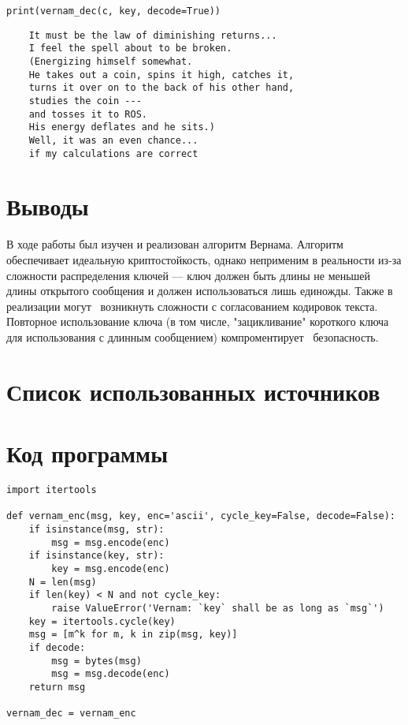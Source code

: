 \documentclass{article}
\begin{document}
\begin{verbatim}
print(vernam_dec(c, key, decode=True))
\end{verbatim}

\begin{verbatim}
    It must be the law of diminishing returns...
    I feel the spell about to be broken.
    (Energizing himself somewhat.
    He takes out a coin, spins it high, catches it,
    turns it over on to the back of his other hand,
    studies the coin ---
    and tosses it to ROS.
    His energy deflates and he sits.)
    Well, it was an even chance...
    if my calculations are correct
\end{verbatim}



\section{Выводы}
В ходе работы был изучен и реализован алгоритм Вернама.
Алгоритм обеспечивает идеальную криптостойкость,
однако неприменим в реальности из-за сложности
распределения ключей --- ключ должен быть
длины не меньшей длины открытого сообщения
и должен использоваться лишь единожды.
Также в реализации могут~\cite{vernam1926cipher}
возникнуть сложности
с согласованием кодировок текста.
Повторное использование ключа
(в том числе, "зацикливание" короткого ключа
для использования с длинным сообщением)
компроментирует~\cite{keyreuse@se} безопасность.

\section{Список использованных источников}
\printbibliography[heading=none]

\section{Код программы}
\begin{verbatim}
import itertools

def vernam_enc(msg, key, enc='ascii', cycle_key=False, decode=False):
    if isinstance(msg, str):
        msg = msg.encode(enc)
    if isinstance(key, str):
        key = msg.encode(enc)
    N = len(msg)
    if len(key) < N and not cycle_key:
        raise ValueError('Vernam: `key` shall be as long as `msg`')
    key = itertools.cycle(key)
    msg = [m^k for m, k in zip(msg, key)]
    if decode:
        msg = bytes(msg)
        msg = msg.decode(enc)
    return msg

vernam_dec = vernam_enc
\end{verbatim}
\end{document}
